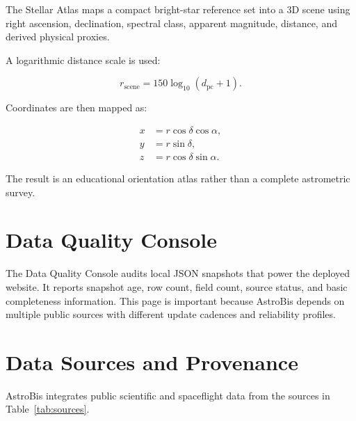 \documentclass[11pt,a4paper]{article}
\begin{document}
The Stellar Atlas maps a compact bright-star reference set into a 3D scene using right ascension, declination, spectral class, apparent magnitude, distance, and derived physical proxies.

A logarithmic distance scale is used:

\begin{equation}
r_{\mathrm{scene}}=150\log_{10}(d_{\mathrm{pc}}+1).
\end{equation}

Coordinates are then mapped as:

\begin{align}
x &= r\cos\delta\cos\alpha,\\
y &= r\sin\delta,\\
z &= r\cos\delta\sin\alpha.
\end{align}

The result is an educational orientation atlas rather than a complete astrometric survey.

\section{Data Quality Console}

The Data Quality Console audits local JSON snapshots that power the deployed website. It reports snapshot age, row count, field count, source status, and basic completeness information. This page is important because AstroBis depends on multiple public sources with different update cadences and reliability profiles.

\section{Data Sources and Provenance}

AstroBis integrates public scientific and spaceflight data from the sources in Table~\ref{tab:sources}.
\end{document}
